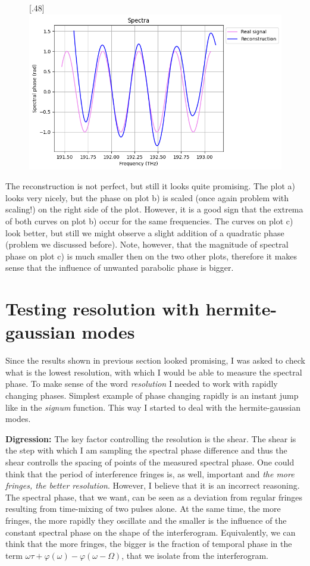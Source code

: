 \documentclass{article}
\begin{document}
\begin{figure}[H]
{}
\vfill
{}[.48\linewidth]{%
\includegraphics[width=\linewidth]{non_parabolic_3}%
}
\label{non_parabolic}
\end{figure}

The reconstruction is not perfect, but still it looks quite promising. The plot a) looks very nicely, but the phase on plot b) is scaled (once again problem with scaling!) on the right side of the plot. However, it is a good sign that the extrema of both curves on plot b) occur for the same frequencies. The curves on plot c) look better, but still we might observe a slight addition of a quadratic phase (problem we discussed before). Note, however, that the magnitude of spectral phase on plot c) is much smaller then on the two other plots, therefore it makes sense that the influence of unwanted parabolic phase is bigger.

\section{Testing resolution with hermite-gaussian modes}

Since the results shown in previous section looked promising, I was asked to check what is the lowest resolution, with which I would be able to measure the spectral phase. To make sense of the word \emph{resolution} I needed to work with rapidly changing phases. Simplest example of phase changing rapidly is an instant jump like in the \emph{signum} function. This way I started to deal with the hermite-gaussian modes.

\textbf{Digression:} The key factor controlling the resolution is the shear. The shear is the step with which I am sampling the spectral phase difference and thus the shear controlls the spacing of points of the measured spectral phase. One could think that the period of interference fringes is, as well, important and \emph{the more fringes, the better resolution}. However, I believe that it is an incorrect reasoning. The spectral phase, that we want, can be seen as a deviation from regular fringes resulting from time-mixing of two pulses alone. At the same time, the more fringes, the more rapidly they oscillate and the smaller is the influence of the constant spectral phase on the shape of the interferogram. Equivalently, we can think that the more fringes, the bigger is the fraction of temporal phase in the term $\omega\tau+\varphi(\omega) - \varphi(\omega-\Omega)$, that we isolate from the interferogram.
\end{document}
